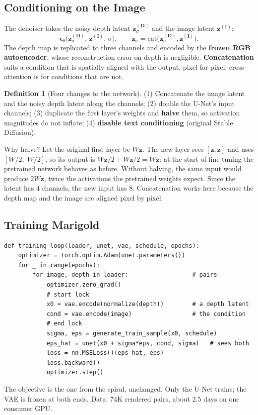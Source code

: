 \documentclass[11pt,a4paper]{article}
\newcommand{\bz}{\bm{z}}
\newcommand{\beps}{\bm{\epsilon}}
\theoremstyle{definition}
\newtheorem{definition}{Definition}[section]
\theoremstyle{plain}
\theoremstyle{remark}
\begin{document}
\subsection{Conditioning on the Image }
The denoiser takes the noisy depth latent $\bz^{(\bm D)}_\sigma$ and the image latent $\bz^{(\bm I)}$:
\begin{equation}
\beps_\theta\bigl(\bz^{(\bm D)}_\sigma,\,\bz^{(\bm I)},\,\sigma\bigr),\qquad \bz_\sigma=\mathrm{cat}\bigl(\bz^{(\bm D)}_\sigma,\bz^{(\bm I)}\bigr).
\end{equation}
The depth map is replicated to three channels and encoded by the \textbf{frozen RGB autoencoder}, whose reconstruction error on depth is negligible. \textbf{Concatenation} suits a condition that is spatially aligned with the output, pixel for pixel; cross-attention is for conditions that are not.

\begin{definition}[Four changes to the network]
(1) Concatenate the image latent and the noisy depth latent along the channels; (2) double the U-Net's input channels; (3) duplicate the first layer's weights and \textbf{halve} them, so activation magnitudes do not inflate; (4) \textbf{disable text conditioning} (original Stable Diffusion).
\end{definition}

\begin{intuition}
Why halve? Let the original first layer be $W\bz$. The new layer sees $[\bz;\bz]$ and uses $[W/2,\;W/2]$, so its output is $W\bz/2+W\bz/2=W\bz$: at the start of fine-tuning the pretrained network behaves as before. Without halving, the same input would produce $2W\bz$, twice the activations the pretrained weights expect. Since the latent has $4$ channels, the new input has $8$. Concatenation works here because the depth map and the image are aligned pixel by pixel.
\end{intuition}

\subsection{Training Marigold }
\begin{lstlisting}
def training_loop(loader, unet, vae, schedule, epochs):
    optimizer = torch.optim.Adam(unet.parameters())
    for _ in range(epochs):
        for image, depth in loader:                  # pairs
            optimizer.zero_grad()
            # start lock
            x0 = vae.encode(normalize(depth))        # a depth latent
            cond = vae.encode(image)                 # the condition
            # end lock
            sigma, eps = generate_train_sample(x0, schedule)
            eps_hat = unet(x0 + sigma*eps, cond, sigma)   # sees both
            loss = nn.MSELoss()(eps_hat, eps)
            loss.backward()
            optimizer.step()
\end{lstlisting}
The objective is the one from the spiral, unchanged. Only the U-Net trains; the VAE is frozen at both ends. Data: 74K rendered pairs, about 2.5 days on one consumer GPU.
\end{document}
